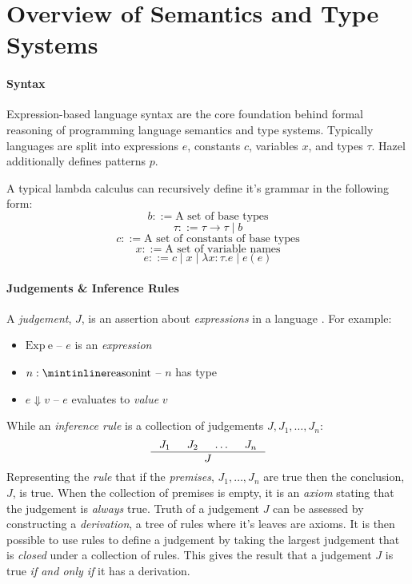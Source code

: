 \chapter{Overview of Semantics and Type Systems}


\subsubsection{Syntax}
Expression-based language syntax are the core foundation behind formal reasoning of programming language semantics and type systems. Typically languages are split into expressions $e$, constants $c$, variables $x$, and types $\tau$. Hazel additionally defines patterns $p$.

A typical lambda calculus can recursively define it's grammar in the following form:
\[b ::= \text{A set of base types}\]
\[\tau ::= \tau \to \tau \mid b\]
\[c ::= \text{A set of constants of base types}\]
\[x ::= \text{A set of variable names}\]
\[e ::= c \mid x \mid \lambda x : \tau. e \mid e(e)\]

\subsubsection{Judgements \& Inference Rules}\label{sec:Judgements}
A \textit{judgement}, $J$, is an assertion about \textit{expressions} in a language \cite{PracticalFoundations}. For example: \begin{itemize}
\item $\mathrm{Exp\ e}$ -- $e$ is an \textit{expression} 
\item $n : \code{int}$ -- $n$ has type 
\item $e \Downarrow v$ -- $e$ evaluates to \textit{value} $v$ 
\end{itemize}
While an \textit{inference rule} is a collection of judgements $J, J_1, \dots, J_n$:
\[\inference{J_1 & J_2 & \dots & J_n}{J}\]
Representing the \textit{rule} that if the \textit{premises}, $J_1, \dots, J_n$ are true then the conclusion, $J$, is true. When the collection of premises is empty, it is an \textit{axiom} stating that the judgement is \textit{always} true. Truth of a judgement $J$ can be assessed by constructing a \textit{derivation}, a tree of rules where it's leaves are axioms. It is then possible to use rules to define a judgement by taking the largest judgement that is \textit{closed} under a collection of rules. This gives the result that a judgement $J$ is true \textit{if and only if} it has a derivation.

